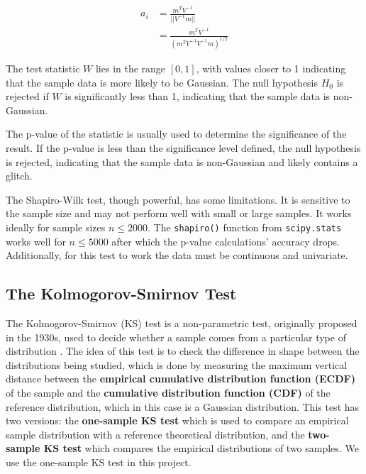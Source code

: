 \documentclass[12pt]{article}
\begin{document}
\begin{align}
    a_i &= \frac{m^T V^{-1}}{||V^{-1} m||} \\
        &= \frac{m^T V^{-1}}{(m^T V^{-1}V^{-1}m)^{1/2}}
    \label{eq:shapiro_wilk_constants}
\end{align}

\medskip
\noindent The test statistic $W$ lies in the range $[0, 1]$, with values closer to 1 indicating that the sample data is more likely to be Gaussian. The null hypothesis $H_0$ is rejected if $W$ is significantly less than 1, indicating that the sample data is non-Gaussian.

\medskip
\noindent The p-value of the statistic is usually used to determine the significance of the result. If the p-value is less than the significance level defined, the null hypothesis is rejected, indicating that the sample data is non-Gaussian and likely contains a glitch.

\medskip
\noindent The Shapiro-Wilk test, though powerful, has some limitations. It is sensitive to the sample size and may not perform well with small or large samples. It works ideally for sample sizes $n \leq 2000$. The \texttt{shapiro()} function from \texttt{scipy.stats} works well for $n \leq 5000$ after which the p-value calculations' accuracy drops. Additionally, for this test to work the data must be continuous and univariate.

\subsection{The Kolmogorov-Smirnov Test}\label{KolmogorovSmirnov}

The Kolmogorov-Smirnov (KS) test is a non-parametric test, originally proposed in the 1930s, used to decide whether a sample comes from a particular type of distribution \cite{Kolmogorov_1951, chakravarti1967}. The idea of this test is to check the difference in shape between the distributions being studied, which is done by measuring the maximum vertical distance between the \textbf{empirical cumulative distribution function (ECDF)} of the sample and the \textbf{cumulative distribution function (CDF)} of the reference distribution, which in this case is a Gaussian distribution. This test has two versions: the \textbf{one-sample KS test} which is used to compare an empirical sample distribution with a reference theoretical distribution, and the \textbf{two-sample KS test} which compares the empirical distributions of two samples. We use the one-sample KS test in this project.
\end{document}
